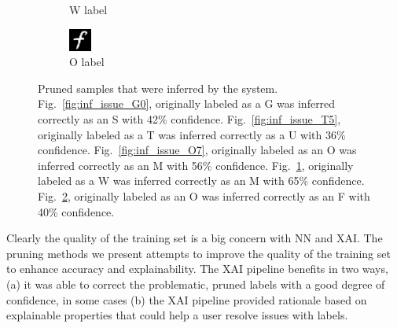 \documentclass[conference]{IEEEtran}
\begin{document}
\begin{figure}[h]
\begin{subfigure}{.20\columnwidth}
        \caption{W label}
        \label{fig:inf_issue_W3}
    \end{subfigure}%
    \begin{subfigure}{.20\columnwidth}
        \centering
        \includegraphics[width=.90\textwidth]{./images/issues/excluded-O-10-inferred-F.png}
        \caption{O label}
        \label{fig:inf_issue_O10}
    \end{subfigure}
    \caption{Pruned samples that were inferred by the system.
    Fig.~\ref{fig:inf_issue_G0}, originally labeled as a G was inferred correctly as an S with 42\% confidence.
    Fig.~\ref{fig:inf_issue_T5}, originally labeled as a T was inferred correctly as a U with 36\% confidence.
    Fig.~\ref{fig:inf_issue_O7}, originally labeled as an O was inferred correctly as an M with 56\% confidence.
    Fig.~\ref{fig:inf_issue_W3}, originally labeled as a W was inferred correctly as an M with 65\% confidence.
    Fig.~\ref{fig:inf_issue_O10}, originally labeled as an O was inferred correctly as an F with 40\% confidence.
    }
    \label{fig:pruned_inf_samples}
\end{figure}

Clearly the quality of the training set is a big concern with NN and XAI.  The
pruning methods we present attempts to improve the quality of the training set
to enhance accuracy and explainability. The XAI pipeline benefits in two ways,
(a) it was able to correct the problematic, pruned labels with a good degree of
confidence, in some cases (b) the XAI pipeline provided rationale based on
explainable properties that could help a user resolve issues with labels.
\end{document}
